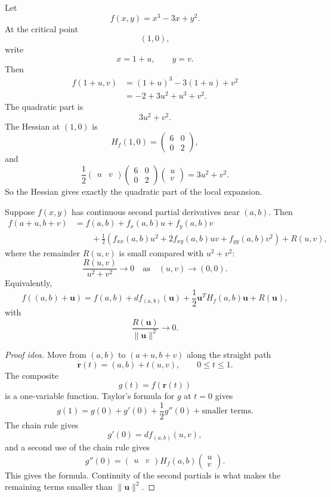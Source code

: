 \begin{example}
Let
\[
    f(x,y)=x^3-3x+y^2.
\]
At the critical point
\[
    (1,0),
\]
write
\[
    x=1+u,
    \qquad
    y=v.
\]
Then
\[
\begin{aligned}
f(1+u,v)
&=
(1+u)^3-3(1+u)+v^2\\
&=
-2+3u^2+u^3+v^2.
\end{aligned}
\]
The quadratic part is
\[
    3u^2+v^2.
\]
The Hessian at \((1,0)\) is
\[
    H_f(1,0)
    =
    \begin{pmatrix}
        6&0\\
        0&2
    \end{pmatrix},
\]
and
\[
\frac12
\begin{pmatrix}u&v\end{pmatrix}
\begin{pmatrix}
        6&0\\
        0&2
\end{pmatrix}
\begin{pmatrix}u\\v\end{pmatrix}
=
3u^2+v^2.
\]
So the Hessian gives exactly the quadratic part of the local expansion.
\end{example}

\begin{theorem}
Suppose \(f(x,y)\) has continuous second partial derivatives near \((a,b)\).  Then
\[
\begin{aligned}
f(a+u,b+v)
&=
f(a,b)
+
f_x(a,b)u
+
f_y(a,b)v\\
&\qquad
+
\frac12
\left(
f_{xx}(a,b)u^2
+
2f_{xy}(a,b)uv
+
f_{yy}(a,b)v^2
\right)
+
R(u,v),
\end{aligned}
\]
where the remainder \(R(u,v)\) is small compared with \(u^2+v^2\):
\[
\boxed{
    \frac{R(u,v)}{u^2+v^2}\to0
    \quad\text{as}\quad
    (u,v)\to(0,0).
}
\]
Equivalently,
\[
\boxed{
f((a,b)+\mathbf u)
=
f(a,b)
+
df_{(a,b)}(\mathbf u)
+
\frac12\mathbf u^T H_f(a,b)\mathbf u
+
R(\mathbf u),
}
\]
with
\[
    \frac{R(\mathbf u)}{\|\mathbf u\|^2}\to0.
\]
\end{theorem}

\begin{proof}[Proof idea]
Move from \((a,b)\) to \((a+u,b+v)\) along the straight path
\[
    \mathbf r(t)=(a,b)+t(u,v),
    \qquad 0\le t\le1.
\]
The composite
\[
    g(t)=f(\mathbf r(t))
\]
is a one-variable function.  Taylor's formula for \(g\) at \(t=0\) gives
\[
    g(1)=g(0)+g'(0)+\frac12g''(0)+\text{smaller terms}.
\]
The chain rule gives
\[
    g'(0)=df_{(a,b)}(u,v),
\]
and a second use of the chain rule gives
\[
    g''(0)
    =
    \begin{pmatrix}u&v\end{pmatrix}
    H_f(a,b)
    \begin{pmatrix}u\\v\end{pmatrix}.
\]
This gives the formula.  Continuity of the second partials is what makes the remaining
terms smaller than \(\|\mathbf u\|^2\).
\end{proof}

